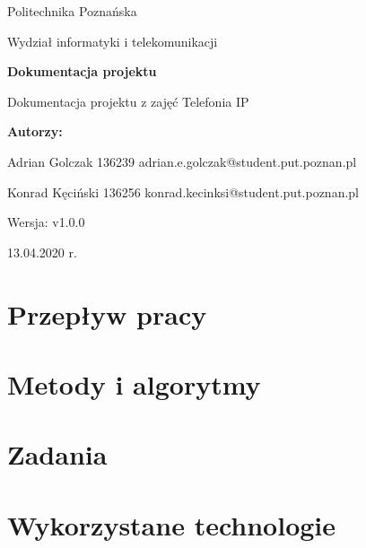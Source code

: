 \documentclass{article}
\newcommand{\version}{v1.0.0}
\begin{document}
\begin{titlepage}
		\begin{center}
			
						\LARGE
			Politechnika Poznańska
			
			\vspace{0.3cm}
			
			\large
			Wydział informatyki i telekomunikacji
			
			\vspace{3.0cm}
			\huge
			\textbf{Dokumentacja projektu}
			
			\vspace{0.5cm}
			
			\large
			Dokumentacja projektu z zajęć Telefonia IP
			
			\vspace{2.4cm}
			
			\LARGE
			\textbf{Autorzy:}
			
			\vspace{0.3cm}
			
			Adrian Golczak 136239
			adrian.e.golczak@student.put.poznan.pl
			
			\vspace{1.0cm}
			
			Konrad Kęciński 136256
			konrad.kecinksi@student.put.poznan.pl
			
			\vspace{0.3cm}

			\vfill
			
			\normalsize
			Wersja: \version
			
			\vspace{2cm}
			

			
			13.04.2020 r.
			
		\end{center}
\end{titlepage}
\tableofcontents
\newpage
	\section{Przepływ pracy}
	
	\section{Metody i algorytmy}
	
	\section{Zadania}
	
	\section{Wykorzystane technologie}
	
\end{document}
